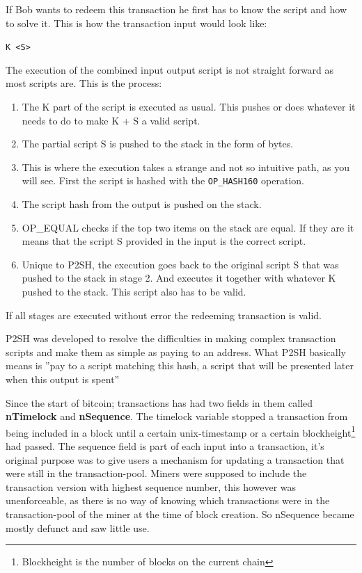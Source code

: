 If Bob wants to redeem this transaction he first has to know the script and how to solve it. This is how the transaction input would look like: 

\texttt{K <S>}

The execution of the combined input output script is not straight forward as most scripts are. This is the process:
\begin{enumerate}
	\item The K part of the script is executed as usual. This pushes or does whatever it needs to do to make K + S a valid script.
	\item The partial script S is pushed to the stack in the form of bytes.
	\item This is where the execution takes a strange and not so intuitive path, as you will see. First the script is hashed with the \texttt{OP\_HASH160} operation.
	\item The script hash from the output is pushed on the stack.
	\item OP\_EQUAL checks if the top two items on the stack are equal. If they are it means that the script S provided in the input is the correct script.
	\item Unique to P2SH, the execution goes back to the original script S that was pushed to the stack in stage 2. And executes it together with whatever K pushed to the stack. This script also has to be valid.\cite{scripthash} 
\end{enumerate}

If all stages are executed without error the redeeming transaction is valid. 

P2SH was developed to resolve the difficulties in making complex transaction scripts and make them as simple as paying to an address. What P2SH basically means is ''pay to a script matching this hash, a script that will be presented later when this output is spent''\cite{antonopoulos_2017}\cite{scripthash}

Since the start of bitcoin; transactions has had two fields in them called \textbf{nTimelock} and \textbf{nSequence}. The timelock variable stopped a transaction from being  included in a block until a certain unix-timestamp or a certain blockheight\footnote{Blockheight is the number of blocks on the current chain} had passed. The sequence field is part of each input into a transaction, it's original purpose was to give users a mechanism for updating a transaction that were still in the transaction-pool. Miners were supposed to include the transaction version with highest sequence number, this however was unenforceable, as there is no way of knowing which transactions were in the transaction-pool of the miner at the time of block creation. So nSequence became mostly defunct and saw little use.

